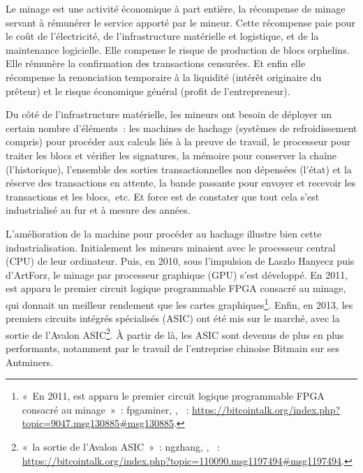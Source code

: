 Le minage est une activité économique à part entière, la récompense de minage servant à rémunérer le service apporté par le mineur. Cette récompense paie pour le coût de l'électricité, de l'infrastructure matérielle et logistique, et de la maintenance logicielle. Elle compense le risque de production de blocs orphelins. Elle rémunère la confirmation des transactions censurées. Et enfin elle récompense la renonciation temporaire à la liquidité (intérêt originaire du prêteur) et le risque économique général (profit de l'entrepreneur).

Du côté de l'infrastructure matérielle, les mineurs ont besoin de déployer un certain nombre d'éléments~: les machines de hachage (systèmes de refroidissement compris) pour procéder aux calculs liés à la preuve de travail, le processeur pour traiter les blocs et vérifier les signatures, la mémoire pour conserver la chaîne (l'historique), l'ensemble des sorties transactionnelles non dépensées (l'état) et la réserve des transactions en attente, la bande passante pour envoyer et recevoir les transactions et les blocs,~etc. Et force est de constater que tout cela s'est industrialisé au fur et à mesure des années.



L'amélioration de la machine pour procéder au hachage illustre bien cette industrialisation. Initialement les mineurs minaient avec le processeur central (CPU) de leur ordinateur. Puis, en 2010, sous l'impulsion de Laszlo Hanyecz puis d'ArtForz, le minage par processeur graphique (GPU) s'est développé. En 2011, est apparu le premier circuit logique programmable FPGA consacré au minage, qui donnait un meilleur rendement que les cartes graphiques\footnote{«~En 2011, est apparu le premier circuit logique programmable FPGA consacré au minage~»~: fpgaminer, , ~: \url{https://bitcointalk.org/index.php?topic=9047.msg130885\#msg130885}.}. Enfin, en 2013, les premiers circuits intégrés spécialisés (ASIC) ont été mis sur le marché, avec la sortie de l'Avalon ASIC\footnote{«~la sortie de l'Avalon ASIC~»~: ngzhang, , ~: \url{https://bitcointalk.org/index.php?topic=110090.msg1197494\#msg1197494}.}. À partir de là, les ASIC sont devenus de plus en plus performants, notamment par le travail de l'entreprise chinoise Bitmain sur ses Antminers.

